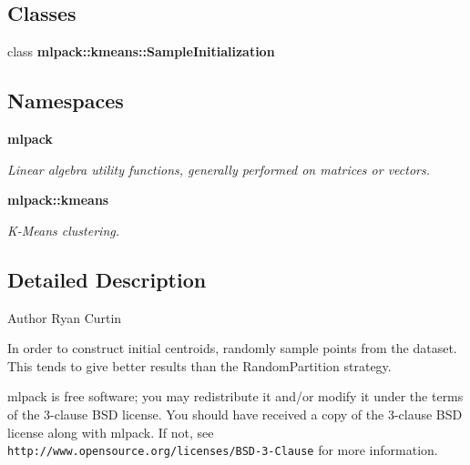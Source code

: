 \subsection*{Classes}
\begin{DoxyCompactItemize}
\item 
class {\bf mlpack\+::kmeans\+::\+Sample\+Initialization}
\end{DoxyCompactItemize}
\subsection*{Namespaces}
\begin{DoxyCompactItemize}
\item 
 {\bf mlpack}
\begin{DoxyCompactList}\small\item\em Linear algebra utility functions, generally performed on matrices or vectors. \end{DoxyCompactList}\item 
 {\bf mlpack\+::kmeans}
\begin{DoxyCompactList}\small\item\em K-\/\+Means clustering. \end{DoxyCompactList}\end{DoxyCompactItemize}


\subsection{Detailed Description}
\begin{DoxyAuthor}{Author}
Ryan Curtin
\end{DoxyAuthor}
In order to construct initial centroids, randomly sample points from the dataset. This tends to give better results than the Random\+Partition strategy.

mlpack is free software; you may redistribute it and/or modify it under the terms of the 3-\/clause B\+SD license. You should have received a copy of the 3-\/clause B\+SD license along with mlpack. If not, see {\tt http\+://www.\+opensource.\+org/licenses/\+B\+S\+D-\/3-\/\+Clause} for more information. 